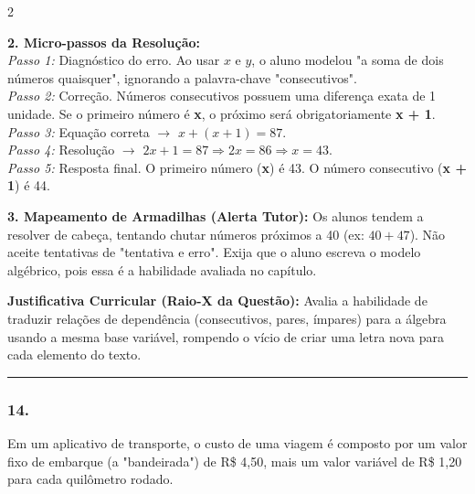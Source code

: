 \begin{multicols*}{2}
\begin{tcolorbox}[colback=CorTitUm!5, colframe=CorTitUm, boxrule=1pt, arc=4pt, left=6pt, right=6pt, top=6pt, bottom=6pt]
    \textbf{2. Micro-passos da Resolução:}\\
    \textit{Passo 1:} Diagnóstico do erro. Ao usar $x$ e $y$, o aluno modelou "a soma de dois números quaisquer", ignorando a palavra-chave "consecutivos".\\
    \textit{Passo 2:} Correção. Números consecutivos possuem uma diferença exata de 1 unidade. Se o primeiro número é \textbf{x}, o próximo será obrigatoriamente \textbf{x + 1}.\\
    \textit{Passo 3:} Equação correta $\rightarrow$ $x + (x + 1) = 87$.\\
    \textit{Passo 4:} Resolução $\rightarrow$ $2x + 1 = 87 \Rightarrow 2x = 86 \Rightarrow x = 43$.\\
    \textit{Passo 5:} Resposta final. O primeiro número (\textbf{x}) é 43. O número consecutivo (\textbf{x + 1}) é 44.\par\vspace{0.1cm}
    
    \textbf{3. Mapeamento de Armadilhas (Alerta Tutor):} Os alunos tendem a resolver de cabeça, tentando chutar números próximos a 40 (ex: $40+47$). Não aceite tentativas de "tentativa e erro". Exija que o aluno escreva o modelo algébrico, pois essa é a habilidade avaliada no capítulo.
    \end{tcolorbox}
    \vspace{0.15cm}
    
    \begin{boxexplicacao}
    \textbf{Justificativa Curricular (Raio-X da Questão):} Avalia a habilidade de traduzir relações de dependência (consecutivos, pares, ímpares) para a álgebra usando a mesma base variável, rompendo o vício de criar uma letra nova para cada elemento do texto.
    \end{boxexplicacao}
\fi

\par\vspace{\espacoQuestao}


\noindent\textcolor{CorLinha}{\rule{\linewidth}{0.5pt}} 
\par\vspace{\espacoPreQuestao}
\subsubsection*{14.} 
\begin{enunciadoLiteral}
Em um aplicativo de transporte, o custo de uma viagem é composto por um valor fixo de embarque (a "bandeirada") de R\$ 4,50, mais um valor variável de R\$ 1,20 para cada quilômetro rodado. 


\end{enunciadoLiteral}
\end{multicols*}
